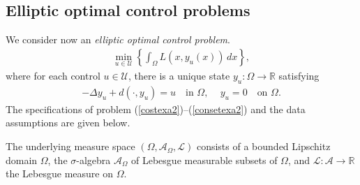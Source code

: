 \documentclass[hidelinks,onefignum,onetabnum]{siamart220329}
\begin{document}
\subsection{Elliptic optimal control problems}

We consider now an \textit{elliptic optimal control problem}.
\begin{align}\label{costexa2}
	\min_{u\in\mathcal U}\left\lbrace\int_{\Omega} L(x,y_{u}(x))\, dx \right\rbrace,
\end{align}
where for each control $u\in\mathcal U$, there is a unique state $y_{u}:\Omega\to\mathbb R$ satisfying
\begin{align}\label{consetexa2}
		-\Delta y_u+d(\cdot,y_u)=u \quad \text{in $\Omega$},
		\quad\,
		y_u=0 \quad \text{on $\Omega$}.
\end{align}
The specifications of problem (\ref{costexa2})--(\ref{consetexa2})  and the  data assumptions are given below.

The underlying measure space $(\Omega,\mathcal A_{\Omega}, \mathcal L)$ consists of  a bounded Lipschitz domain $\Omega$, the $\sigma$-algebra $\mathcal A_{\Omega}$  of Lebesgue measurable subsets of $\Omega$, and $\mathcal L:\mathcal A\to\mathbb R$ the Lebesgue measure on $\Omega$. 
\end{document}
